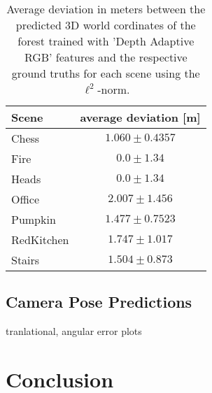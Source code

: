 \documentclass[final]{cvpr}
\begin{document}
\begin{table}[h]
	\begin{center}
	\begin{tabular}{|l|c|}
	\hline
	Scene & average deviation [m]\\
	\hline\hline
	Chess 		& 	$1.060 \pm 0.4357$ \\
	Fire 		& 	$0.0 \pm 1.34$	\\
	Heads 		& 	$0.0 \pm 1.34$	\\
	Office 		&   $2.007 \pm 1.456$ \\
	Pumpkin 	& 	$1.477 \pm 0.7523$ \\
	RedKitchen 	& 	$1.747 \pm 1.017$ \\
	Stairs 		& 	$1.504 \pm 0.873$ \\
	\hline
	\end{tabular}
	\end{center}
	\label{tab:forest-error}
	\caption{Average deviation in meters between the predicted 3D world cordinates of the forest trained with 
	'Depth Adaptive RGB' features and the respective ground truths for each scene using the $\ell^2$-norm.}
\end{table}



\subsection{Camera Pose Predictions}
tranlational, angular error
plots

\section{Conclusion}

{\small


}
\end{document}
